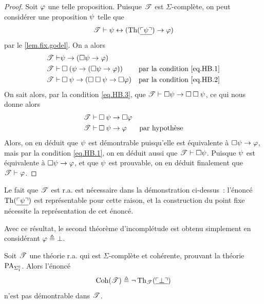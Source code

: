 \begin{proof}
  Soit $\varphi$ une telle proposition.
  Puisque $\mathscr T$ est $\Sigma$-complète, on peut considérer une proposition
  $\psi$ telle que
  \[\mathscr T \vdash \psi \mathrel{\leftrightarrow} (\operatorname{Th}(\underline{\ulcorner\psi\urcorner}) \to \varphi)\]
  par le \cref{lem.fix.godel}. On a alors
  \begin{align*}
    \mathscr T \vdash & \psi \to (\mathbin{\square} \psi \to \varphi) \\
    \mathscr T \vdash & \mathbin{\square}(\psi \to (\mathbin{\square} \psi \to \varphi))
    & \text{par la condition } \ref{eq.HB.1}
    \\
    \mathscr T \vdash & \mathbin{\square} \psi \to (\mathbin{\square}\mathbin{\square} \psi \to
    \mathbin{\square}\varphi) & \text{par la condition } \ref{eq.HB.2}\\
  \end{align*}
  On sait alors, par la condition \ref{eq.HB.3}, que
  $\mathscr T \vdash \mathbin{\square} \psi \to \mathbin{\square} \mathbin{\square} \psi$, ce qui
  nous donne alors
  \begin{align*}
    \mathscr T \vdash & \mathbin{\square} \psi \to \mathbin{\square}\varphi \\
    \mathscr T \vdash & \mathbin{\square} \psi \to \varphi
    & \text{par hypothèse} \\
  \end{align*}
  Alors, on en déduit que $\psi$ est démontrable puisqu'elle est équivalente à
  $\mathbin{\square}\psi \to \varphi$, mais par la condition \ref{eq.HB.1}, on
  en déduit aussi que $\mathscr T \vdash \mathbin{\square} \psi$. Puisque
  $\psi$ est équivalente à $\mathbin{\square} \psi \to \varphi$, et que
  $\psi$ est prouvable, on en déduit finalement que $\mathscr T \vdash \varphi$.
\end{proof}

\begin{remark}
  Le fait que $\mathscr T$ est r.a. est nécessaire dans la démonstration
  ci-dessus~: l'énoncé $\operatorname{Th}(\underline{\ulcorner\psi\urcorner})$ est représentable pour
  cette raison, et la construction du point fixe nécessite la représentation de
  cet énoncé.
\end{remark}

Avec ce résultat, le second théorème d'incomplétude est obtenu simplement en
considérant $\varphi \triangleq \bot$.

\begin{theorem}
  Soit $\mathscr T$ une théorie r.a. qui est $\Sigma$-complète et cohérente,
  prouvant la théorie $\operatorname{PA}_{\Sigma^0_{1}}$. Alors l'énoncé
  \[\operatorname{Coh}(\mathscr T) \triangleq \lnot \operatorname{Th}_{\mathscr T}(\underline{\ulcorner\bot\urcorner})\]
  n'est pas démontrable dans $\mathscr T$.
\end{theorem}

